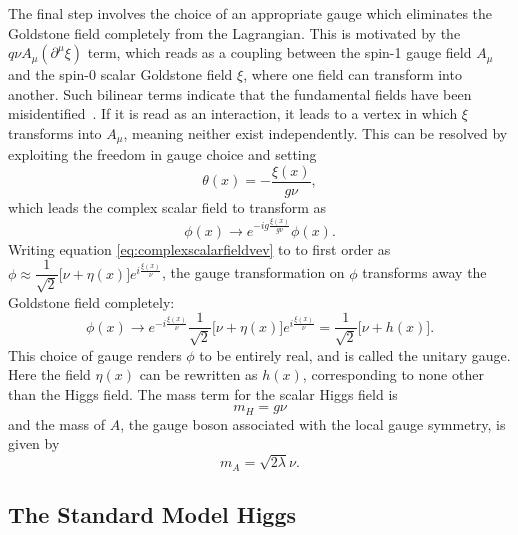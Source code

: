 The final step involves the choice of an appropriate gauge which eliminates the Goldstone field completely from the Lagrangian. This is motivated by the $q\nu A_{\mu}({\partial^{\mu}\xi})$ term, which reads as a coupling between the spin-1 gauge field $A_{\mu}$ and the spin-0 scalar Goldstone field $\xi$, where one field can transform into another. Such bilinear terms indicate that the fundamental fields have been misidentified~\cite{Griffiths:2008zz}. If it is read as an interaction, it leads to a vertex in which $\xi$ transforms into $A_{\mu}$, meaning neither exist independently. This can be resolved by exploiting the freedom in gauge choice and setting 
\begin{equation}
    \theta(x)=-\dfrac{\xi(x)}{g\nu},
\end{equation}
which leads the complex scalar field to transform as 
\begin{equation}
    \phi(x)\rightarrow e^{-ig\frac{\xi(x)}{g\nu}}\phi(x).
\end{equation}
Writing equation \ref{eq:complexscalarfieldvev} to to first order as $\phi\approx\dfrac{1}{\sqrt{2}}\Big[\nu+\eta(x)\Big]e^{i\frac{\xi(x)}{\nu}}$, the gauge transformation on $\phi$ transforms away the Goldstone field completely:
\begin{equation}
    \phi(x)\rightarrow e^{-i\frac{\xi(x)}{\nu}} \dfrac{1}{\sqrt{2}}\Big[\nu+\eta(x)\Big]e^{i\frac{\xi(x)}{\nu}}
    = \dfrac{1}{\sqrt{2}}\Big[\nu+h(x)\Big].
\end{equation}
This choice of gauge renders $\phi$ to be entirely real, and is called the unitary gauge. Here the field $\eta(x)$ can be rewritten as $h(x)$, corresponding to none other than the Higgs field. The mass term for the scalar Higgs field is 
\begin{equation}
    m_{H} = g\nu
\end{equation}
and the mass of $A$, the gauge boson associated with the local gauge symmetry, is given by
\begin{equation}
    m_A=\sqrt{2\lambda}\nu.
\end{equation}

\subsection{The Standard Model Higgs}


